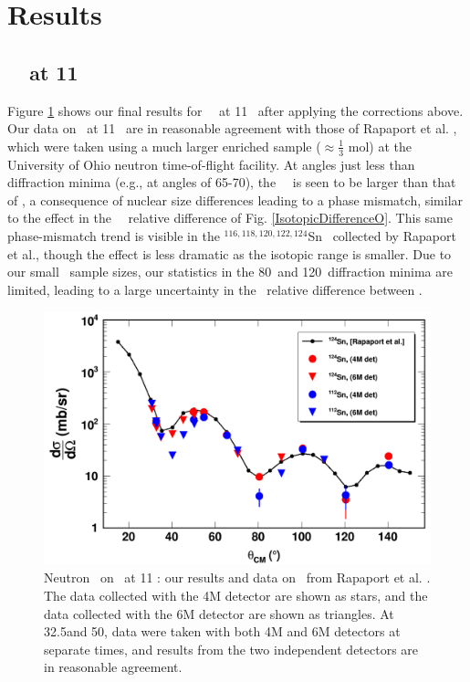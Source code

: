\section{Results}
\subsection{\snTwelveFour\ \el\ at 11 \mega\electronvolt}
Figure \ref{SnECS_11MeV} shows our final results for \snTwelveFour\
\el\ at 11 \mega\electronvolt\ after applying the corrections above. Our data on \snFour\
at 11 \mega\electronvolt\ are in reasonable agreement with those of Rapaport et al.
\cite{Rapaport1980}, which were taken using a much larger enriched sample
($\approx\frac{1}{3}$ mol) at the University of Ohio neutron time-of-flight
facility. At angles just less than diffraction minima (e.g., at
angles of 65-70\textdegree), the \snTwelve\ \el\ is seen to be larger
than that of \snFour, a consequence of nuclear size
differences leading to a phase mismatch, similar to the effect in the \oSixEight\
\tot\ relative difference of Fig. \ref{IsotopicDifferenceO}. This same
phase-mismatch trend is
visible in the $^{116,118,120,122,124}$Sn \el\ collected by Rapaport et al.,
though the effect is less dramatic as the isotopic range is smaller.
Due to our small \snTwelveFour\ sample sizes,
our statistics in the 80\textdegree\ and 120\textdegree\ diffraction minima are
limited, leading to a large uncertainty in the \el\ relative difference between
\snTwelveFour.

\begin{figure}[tb]
    \centering
    \includegraphics[width = 1.0\textwidth]{figures/ECSResults2017.png}
    \caption[Neutron \el\ on \snTwelveFour\ at 11 \mega\electronvolt: our results and literature data]
    {
        Neutron \el\ on \snTwelveFour\ at 11 \mega\electronvolt: our results and data on
        \snFour\ from Rapaport et al. \cite{Rapaport1980}. The data collected
        with the 4M detector are shown as stars, and the data collected
        with the 6M detector are shown as triangles. At 32.5\textdegree and
        50\textdegree, data were taken with both 4M and 6M detectors at separate
        times, and results from the two independent detectors are in reasonable agreement.
    }
    \label{SnECS_11MeV}
\end{figure}


